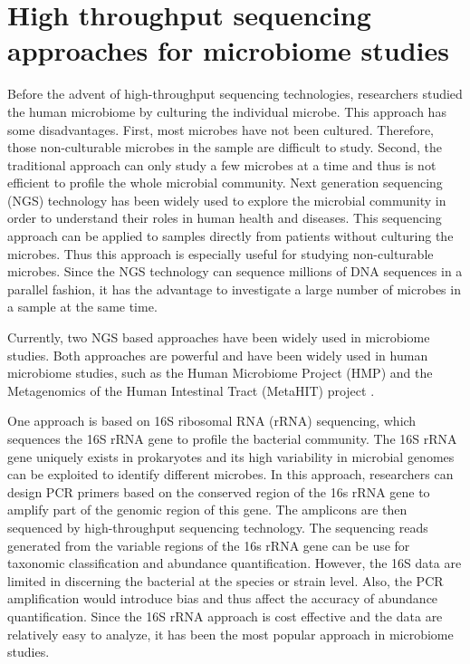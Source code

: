 \section{High throughput sequencing approaches for microbiome studies}
Before the advent of high-throughput sequencing technologies, researchers studied the human microbiome by culturing the individual microbe. This approach has some disadvantages. First, most microbes have not been cultured. Therefore, those non-culturable microbes in the sample are difficult to study. Second, the traditional approach can only study a few microbes at a time and thus is not efficient to profile the whole microbial community. Next generation sequencing (NGS) technology has been widely used to explore the microbial community in order to understand their roles in human health and diseases. This sequencing approach can be applied to samples directly from patients without culturing the microbes. Thus this approach is especially useful for studying non-culturable microbes. Since the NGS technology can sequence millions of DNA sequences in a parallel fashion, it has the advantage to investigate a large number of microbes in a sample at the same time.


Currently, two NGS based approaches have been widely used in microbiome studies. Both approaches are powerful and have been widely used in human microbiome studies, such as the Human Microbiome Project (HMP) \citep{turnbaugh2007human} and the Metagenomics of the Human Intestinal Tract (MetaHIT) project \citep{qin2010human}. 

One approach is based on 16S ribosomal RNA (rRNA) sequencing, which sequences the 16S rRNA gene to profile the bacterial community. The 16S rRNA gene uniquely exists in prokaryotes and its high variability in microbial genomes can be exploited to identify different microbes. In this approach, researchers can design PCR primers based on the conserved region of the 16s rRNA gene to amplify part of the genomic region of this gene. The amplicons are then sequenced by high-throughput sequencing technology. The sequencing reads generated from the variable regions of the 16s rRNA gene can be use for taxonomic classification and abundance quantification. However, the 16S data are limited in discerning the bacterial at the species or strain level. Also, the PCR amplification would introduce bias and thus affect the accuracy of abundance quantification. Since the 16S rRNA approach is cost effective and the data are relatively easy to analyze, it has been the most popular approach in microbiome studies. 

